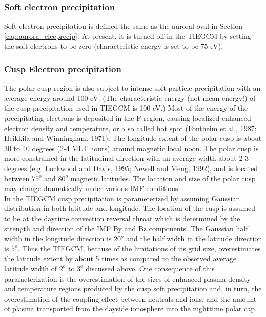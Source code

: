 \subsubsection{Soft electron precipitation}\label{cap:aurora_softelecprecip}
%
Soft electron precipitation is defined the same as the auroral oval in Section 
\ref{cap:aurora_elecprecip}. At present, it is turned off in the TIEGCM by setting 
the soft electrons to be zero (characteristic energy is set to be 75 eV). 
%
\subsubsection{Cusp Electron precipitation}\label{cap:aurora_cuspelecprecip}
%
The polar cusp region is also subject to intense soft particle 
precipitation with an average energy around 100 eV. (The characteristic 
energy (not mean energy!) of the cusp precipitation used in TIEGCM is 
100 eV.) Most of the energy of the precipitating electrons is deposited 
in the F-region, causing localized enhanced electron density and temperature, 
or a so called hot spot (Fontheim et al., 1987; Heikkila and Winningham, 1971). 
The longitude extent of the polar cusp is about 30 to 40 degrees (2-4 MLT hours) 
around magnetic local noon. The polar cusp is more constrained in the latitudinal 
direction with an average width about 2-3 degrees (e.g. Lockwood and Davis, 1995; 
Newell and Meng, 1992), and is located between $75^o$ and $80^o$ magnetic latitudes. 
The location and size of the polar cusp may change dramatically under various 
IMF conditions. \\
%
In the TIEGCM cusp precipitation is parameterized by assuming Gaussian 
distribution in both latitude and longitude. The location of the cusp is 
assumed to be at the daytime convection reversal throat which is determined 
by the strength and direction of the IMF By and Bz components. 
The Gaussian half width in the longitude direction is $20^o$ 
and the half width in the latitude direction is $5^o$. Thus the TIEGCM, because 
of the limitations of its grid size, overestimates the latitude extent by 
about 5 times as compared to the observed average latitude width of $2^o$ to 
$3^o$ discussed above. One consequence of this parameterization is the 
overestimation of the sizes of enhanced plasma density and temperature 
regions produced by the cusp soft precipitation and, in turn, the 
overestimation of the coupling effect between neutrals and ions, and the 
amount of plasma transported from the dayside ionosphere into the nighttime 
polar cap. \\
